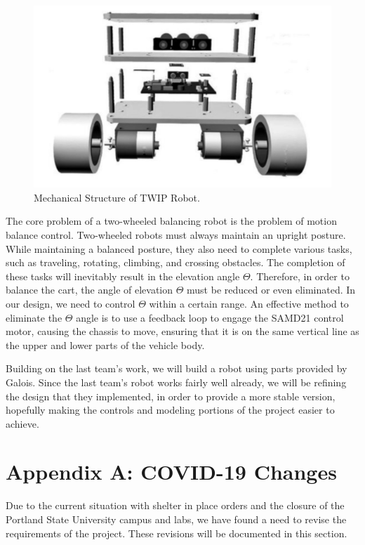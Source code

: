\documentclass[a4paper,12pt]{article}
\begin{document}
 \begin{figure}[H]
\includegraphics[width = \textwidth]{images/PDS_Robot.png}
\caption{Mechanical Structure of TWIP Robot.\cite{zhuqin}}
	\end{figure}
\par
The core problem of a two-wheeled balancing robot is the problem of motion balance control. Two-wheeled robots must always maintain an upright posture. While maintaining a balanced posture, they also need to complete various tasks, such as traveling, rotating, climbing, and crossing obstacles. The completion of these tasks will inevitably result in the elevation angle $\Theta$. Therefore, in order to balance the cart, the angle of elevation $\Theta$ must be reduced or even eliminated. In our design, we need to control $\Theta$ within a certain range. An effective method to eliminate the $\Theta$ angle is to use a feedback loop to engage the SAMD21 control motor, causing the chassis to move, ensuring that it is on the same vertical line as the upper and lower parts of the vehicle body.\par

Building on the last team's work, we will build a robot using parts provided by Galois. Since the last team's robot works fairly well already, we will be refining the design that they implemented, in order to provide a more stable version, hopefully making the controls and modeling portions of the project easier to achieve.

\newpage

\newpage
\section{Appendix A: COVID-19 Changes}
Due to the current situation with shelter in place orders and the closure of the Portland State University campus and labs, we have found a need to revise the requirements of the project. These revisions will be documented in this section.
\end{document}
